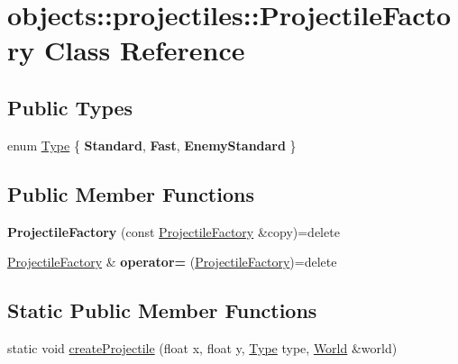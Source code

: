 \hypertarget{classobjects_1_1projectiles_1_1ProjectileFactory}{}\section{objects\+:\+:projectiles\+:\+:Projectile\+Factory Class Reference}
\label{classobjects_1_1projectiles_1_1ProjectileFactory}
\subsection*{Public Types}
\begin{DoxyCompactItemize}
\item 
enum \hyperlink{classobjects_1_1projectiles_1_1ProjectileFactory_abc75eceeed2dbadc736fb93fd6046698}{Type} \{ {\bfseries Standard},
{\bfseries Fast}, 
{\bfseries Enemy\+Standard}
 \}
\end{DoxyCompactItemize}
\subsection*{Public Member Functions}
\begin{DoxyCompactItemize}
\item 
\mbox{\label{classobjects_1_1projectiles_1_1ProjectileFactory_ad198f3f077022468b6bdd2d114c3a969}}
{\bfseries Projectile\+Factory} (const \hyperlink{classobjects_1_1projectiles_1_1ProjectileFactory}{Projectile\+Factory} \&copy)=delete
\item 
\mbox{\label{classobjects_1_1projectiles_1_1ProjectileFactory_a23c5feb5df880e4cf133f7e9739deda7}}
\hyperlink{classobjects_1_1projectiles_1_1ProjectileFactory}{Projectile\+Factory} \& {\bfseries operator=} (\hyperlink{classobjects_1_1projectiles_1_1ProjectileFactory}{Projectile\+Factory})=delete
\end{DoxyCompactItemize}
\subsection*{Static Public Member Functions}
\begin{DoxyCompactItemize}
\item 
static void \hyperlink{classobjects_1_1projectiles_1_1ProjectileFactory_ae2fdae24114f0a54e474e1cf14eb34d5}{create\+Projectile} (float x, float y, \hyperlink{classobjects_1_1projectiles_1_1ProjectileFactory_abc75eceeed2dbadc736fb93fd6046698}{Type} type, \hyperlink{classWorld}{World} \&world)
\end{DoxyCompactItemize}


